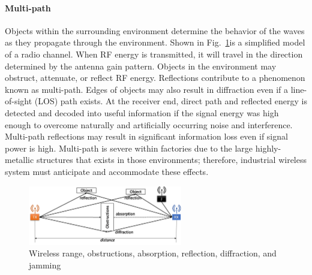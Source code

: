 \paragraph{Multi-path} Objects within the surrounding environment determine the behavior of the waves as they propagate through the environment.  Shown in Fig.~\ref{intro:fig:multipath}is a simplified model of a radio channel. When RF energy is transmitted, it will travel in the direction determined by the antenna gain pattern.  Objects in the environment may obstruct, attenuate, or reflect RF energy.  Reflections contribute to a phenomenon known as multi-path.   Edges of objects may also result in diffraction even if a line-of-sight (LOS) path exists.  At the receiver end, direct path and reflected energy is detected and decoded into useful information if the signal energy was high enough to overcome naturally and artificially occurring noise and interference.  Multi-path reflections may result in significant information loss even if signal power is high.  Multi-path is severe within factories due to the large highly-metallic structures that exists in those environments\cite{Candell2017.NIST1951,Rappaport1991,Remley2008}; therefore, industrial wireless system must anticipate and accommodate these effects.

\begin{figure}
	\centering
	\includegraphics[width=0.6\textwidth]{chapter-intro/images/multipath}
	\caption{Wireless range, obstructions, absorption, reflection, diffraction, and jamming}
	\label{intro:fig:multipath}
\end{figure}


